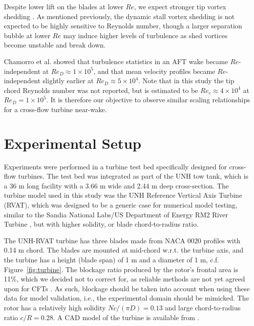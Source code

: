 \documentclass[energies,article,accept,moreauthors,pdftex,12pt,a4paper]{mdpi}
\begin{document}
Despite lower lift on the blades at lower $Re$, we expect stronger tip vortex
shedding \cite{Yoon2005}. As mentioned previously, the dynamic stall vortex
shedding is not expected to be highly sensitive to Reynolds number, though a
larger separation bubble at lower $Re$ may induce higher levels of turbulence as
shed vortices become unstable and break down. 

Chamorro et al. \cite{Chamorro2012} showed that turbulence statistics in an AFT
wake became $Re$-independent at $Re_D \approx 1 \times 10^5$, and that mean
velocity profiles became $Re$-independent slightly earlier at $Re_D \approx 5
\times 10^4$. Note that in this study the tip chord Reynolds number was not
reported, but is estimated to be $Re_c \approx 4 \times 10^4$ at $Re_D=1 \times
10^5$. It is therefore our objective to observe similar scaling relationships
for a cross-flow turbine near-wake.


\section{Experimental Setup}

Experiments were performed in a turbine test bed specifically designed for
cross-flow turbines. The test bed was integrated as part of the UNH tow tank,
which is a 36 m long facility with a 3.66 m wide and 2.44 m deep cross-section.
The turbine model used in this study was the UNH Reference Vertical Axis Turbine
(RVAT), which was designed to be a generic case for numerical model testing,
similar to the Sandia National Labs/US Department of Energy RM2 River Turbine
\cite{Neary2014}, but with higher solidity, or blade chord-to-radius ratio.

The UNH-RVAT turbine has three blades made from NACA 0020 profiles with 0.14 m
chord. The blades are mounted at mid-chord w.r.t. the turbine axis, and the
turbine has a height (blade span) of 1 m and a diameter of 1 m, c.f.
Figure~\ref{fig:turbine}. The blockage ratio produced by the rotor's frontal
area is 11\%, which we decided not to correct for, as reliable methods are
not yet agreed upon for CFTs \cite{Cavagnaro2014}. As such, blockage should be
taken into account when using these data for model validation, i.e., the
experimental domain should be mimicked. The rotor has a relatively high solidity
$Nc/(\pi D) = 0.13$ and large chord-to-radius ratio $c/R = 0.28$. A CAD model of
the turbine is available from \cite{Bachant2014-RVAT-CAD}.
\end{document}
